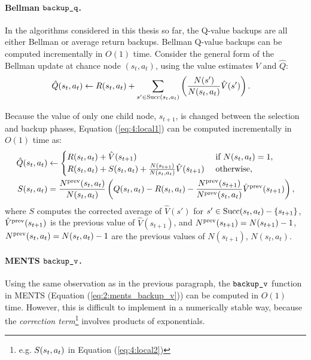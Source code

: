     \paragraph{Bellman ${\textnormal{\texttt{backup\_q}}}$.}
    
    In the algorithms considered in this thesis so far, the Q-value backups are all either Bellman or average return backups. Bellman Q-value backups can be computed incrementally in $O(1)$ time. Consider the general form of the Bellman update at chance node $(s_t,a_t)$, using the value estimates $\hat{V}$ and $\hat{Q}$:
    \begin{align}
        \hat{Q}(s_t,a_t) &\leftarrow 
            R(s_t,a_t) + \sum_{s' \in {\textnormal{Succ}(s_t,a_t)}} \left( \frac{N(s')}{N(s_t,a_t)} \hat{V}(s') \right). 
                \label{eq:4:local1} 
    \end{align}

    Because the value of only one child node, $s_{t+1}$, is changed between the selection and backup phases, Equation (\ref{eq:4:local1}) can be computed incrementally in $O(1)$ time as:
    \begin{align}
        \hat{Q}(s_t,a_t) &\leftarrow \begin{cases}
            R(s_t,a_t) + \hat{V}(s_{t+1}) & \text{ if } N(s_t,a_t) = 1, \\
            R(s_t,a_t)  
                + {S}(s_t,a_t)
                + \frac{N(s_{t+1})}{N(s_t,a_t)}\hat{V}(s_{t+1}) & \text{ otherwise,}
        \end{cases} \label{eq:4:local2} \\
        {S}(s_t,a_t) &= 
            \frac{N^{{\text{prev}}}(s_t,a_t)}{N(s_t,a_t)} \left( Q(s_t,a_t) - R(s_t,a_t) 
                - \frac{N^{{\text{prev}}}(s_{t+1})}{N^{{\text{prev}}}(s_t,a_t)} \hat{V}^{{\text{prev}}}(s_{t+1}) \right),
    \end{align}
    where $S$ computes the corrected average of $\hat{V}(s')$ for $s'\in{\textnormal{Succ}(s_t,a_t)}-\{s_{t+1}\}$, $\hat{V}^{{\text{prev}}}(s_{t+1})$ is the previous value of $\hat{V}(s_{t+1})$, and $N^{{\text{prev}}}(s_{t+1}) = N(s_{t+1})-1$, $N^{{\text{prev}}}(s_t,a_t) = N(s_t,a_t)-1$ are the previous values of $N(s_{t+1})$, $N(s_t,a_t)$.

    \paragraph{MENTS ${\textnormal{\texttt{backup\_v}}}$.}

    Using the same observation as in the previous paragraph, the ${\textnormal{\texttt{backup\_v}}}$ function in MENTS (Equation (\ref{eq:2:ments_backup_v})) can be computed in $O(1)$ time. However, this is difficult to implement in a numerically stable way, because the \textit{correction term}\footnote{e.g. ${S}(s_t,a_t)$ in Equation (\ref{eq:4:local2})} involves products of exponentials.

